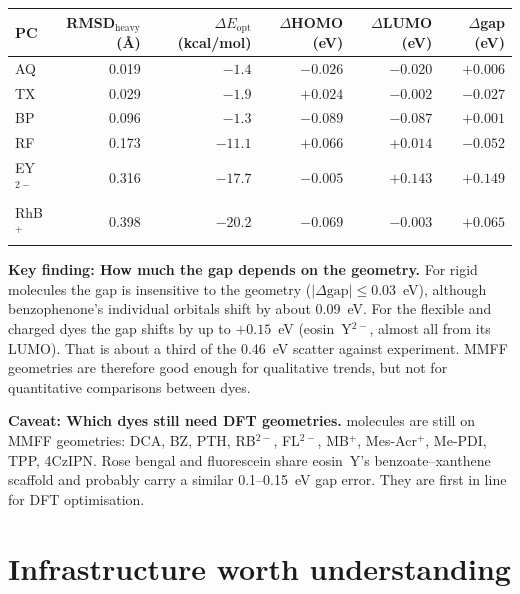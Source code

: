 \documentclass[11pt,a4paper]{article}
\newcommand{\notehead}[2]{\par\smallskip\noindent\textbf{#1: #2.}\enspace}
\begin{document}
\begin{center}\small
\begin{tabular}{@{}lrrrrr@{}}
\toprule
PC & RMSD$_\text{heavy}$ (\AA) & $\Delta E_\text{opt}$ (kcal/mol) & $\Delta$HOMO (eV) & $\Delta$LUMO (eV) & $\Delta$gap (eV) \\
\midrule
AQ & 0.019 & $-1.4$ & $-0.026$ & $-0.020$ & ${+}0.006$ \\
TX & 0.029 & $-1.9$ & ${+}0.024$ & $-0.002$ & $-0.027$ \\
BP & 0.096 & $-1.3$ & $-0.089$ & $-0.087$ & ${+}0.001$ \\
RF & 0.173 & $-11.1$ & ${+}0.066$ & ${+}0.014$ & $-0.052$ \\
EY$^{2-}$ & 0.316 & $-17.7$ & $-0.005$ & ${+}0.143$ & ${+}0.149$ \\
RhB$^+$ & 0.398 & $-20.2$ & $-0.069$ & $-0.003$ & ${+}0.065$ \\
\bottomrule
\end{tabular}
\end{center}

\notehead{Key finding}{How much the gap depends on the geometry}
For rigid molecules the gap is insensitive to the geometry ($|\Delta\text{gap}| \le 0.03$~eV), although
benzophenone's individual orbitals shift by about 0.09~eV. For the flexible and charged dyes the gap shifts
by up to $+0.15$~eV (eosin~Y$^{2-}$, almost all from its LUMO). That is about a third of the
0.46~eV scatter against experiment. MMFF geometries are therefore good enough for qualitative trends, but
not for quantitative comparisons between dyes.
\par\smallskip

\notehead{Caveat}{Which dyes still need DFT geometries}
10 molecules are still on MMFF geometries: DCA, BZ, PTH, RB$^{2-}$, FL$^{2-}$, MB$^+$, Mes-Acr$^+$, Me-PDI, TPP, 4CzIPN. Rose bengal and fluorescein share eosin~Y's
benzoate--xanthene scaffold and probably carry a similar 0.1--0.15~eV gap error. They are first in line
for DFT optimisation.
\par\smallskip

\section{Infrastructure worth understanding}\label{sec:infra}
\end{document}
